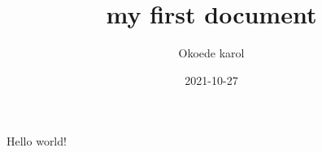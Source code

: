 \documentclass{article}
\title{my first document}
\date{2021-10-27}
\author{Okoede karol}
\begin{document}
	\maketitle
	\newpage
	Hello world!
\end{document}
